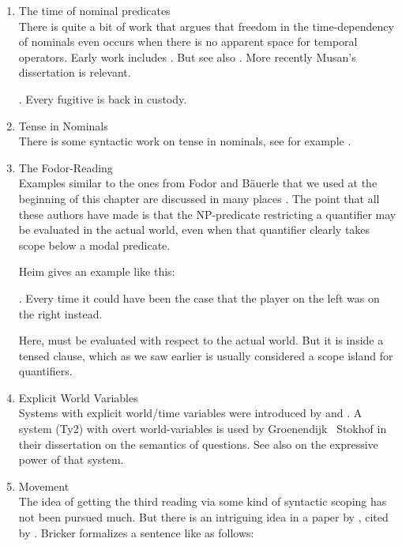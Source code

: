 \begin{enumerate}
  \medskip\item The time of nominal predicates\\[6pt]
  There is quite a bit of work that argues that freedom in the time-dependency of nominals even occurs when there is no apparent space for temporal operators. Early work includes \citet{enc:diss, enc:L&P:86}. But see also \citet{ejerhed:tense}. More recently Musan's dissertation \citep{musan:diss} is relevant.
  
  \ex. Every fugitive is back in custody.
  
  \medskip\item Tense in Nominals\\[6pt]
  There is some syntactic work on tense in nominals, see for example \citet{wiltschko:tenseond}.
  
  \medskip\item The Fodor-Reading\\[6pt]
  Examples similar to the ones from Fodor and Bäuerle that we used at the beginning of this chapter are discussed in many places \citep{ioup:specificity77, hellan:scope78, abusch:1994:indefinites, bonomi:transp95, farkas:scope97}. The point that all these authors have made is that the NP-predicate restricting a quantifier may be evaluated in the actual world, even when that quantifier clearly takes scope below a modal predicate.
  
  Heim \citep{heim:artikel} gives an example like this:
  
  \ex. Every time it could have been the case that the player on the left was on the right instead.
  
  Here,  must be evaluated with respect to the actual world. But it is inside a tensed clause, which \dash as we saw earlier \dash is usually considered a scope island for quantifiers.
  
  \medskip\item Explicit World Variables\\[6pt]
  Systems with explicit world/time variables were introduced by \citet{tichy:approach} and \citet{gallin:intensional}. A system (Ty2) with overt world-variables is used by Groenendijk \amp\ Stokhof in their dissertation on the semantics of questions. See also \citet{zimmermann:diss} on the expressive power of that system.
  
  \medskip\item Movement\\[6pt]
  The idea of getting the third reading via some kind of syntactic scoping has not been pursued much. But there is an intriguing idea in a paper by \citet{bricker:pluraldere:89}, cited by \citet[p. 76]{cresswell:entities}. Bricker formalizes a sentence like  as follows:
  

\end{enumerate}
